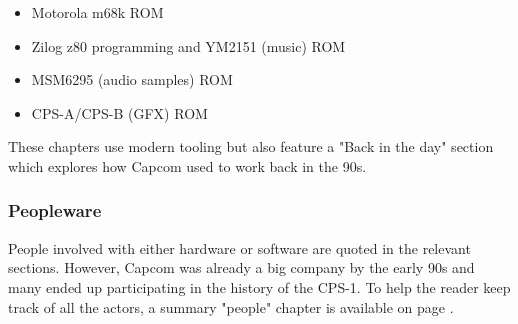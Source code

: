 \begin{itemize}[topsep=0pt]
\item Motorola m68k ROM
\item Zilog z80 programming and YM2151 (music) ROM
\item MSM6295 (audio samples) ROM
\item CPS-A/CPS-B (GFX) ROM
\end{itemize}

These chapters use modern tooling but also feature a "Back in the day" section which explores how Capcom used to work back in the 90s.

\subsubsection{Peopleware}
People involved with either hardware or software are quoted in the relevant sections. However, Capcom was already a big company by the early 90s and many ended up participating in the history of the CPS-1. To help the reader keep track of all the actors, a summary "people" chapter is available on page \pageref{people}.

